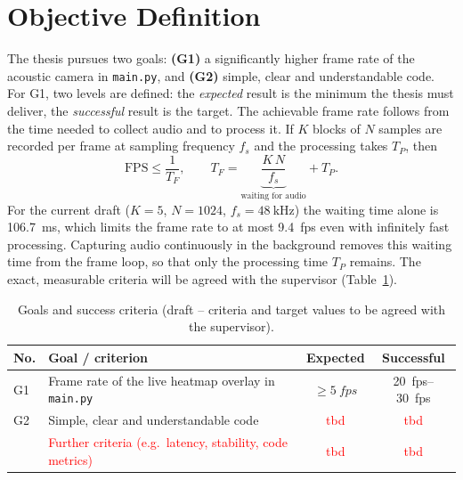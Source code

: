 \documentclass[11pt,a4paper]{article}
\newcommand{\ph}[1]{\textcolor{red}{#1}}
\newcommand{\code}[1]{\texttt{#1}}
\begin{document}
\section{Objective Definition}
The thesis pursues two goals: \textbf{(G1)} a significantly higher frame rate
of the acoustic camera in \code{main.py}, and \textbf{(G2)} simple, clear and
understandable code. For G1, two levels are defined: the \emph{expected}
result is the minimum the thesis must deliver, the \emph{successful} result is
the target. The achievable frame rate follows from the time needed to collect
audio and to process it. If $K$ blocks of $N$ samples are recorded per frame at
sampling frequency $f_s$ and the processing takes $T_P$, then
\begin{equation}
  \mathrm{FPS} \leq \frac{1}{T_F}, \qquad
  T_F = \underbrace{\frac{K\,N}{f_s}}_{\text{waiting for audio}} + T_P .
  \label{eq:fps}
\end{equation}
For the current draft ($K=5$, $N=1024$, $f_s=\SI{48}{\kilo\hertz}$) the waiting
time alone is \SI{106.7}{\milli\second}, which limits the frame rate to at most
\SI{9.4}{fps} even with infinitely fast processing. Capturing audio
continuously in the background removes this waiting time from the frame loop,
so that only the processing time $T_P$ remains. The exact, measurable criteria
will be agreed with the supervisor (Table~\ref{tab:objectives}).

\begin{table}[H]
  \centering
  \caption{Goals and success criteria (draft -- criteria and target values to be agreed with the supervisor).}
  \label{tab:objectives}
  \small
  \begin{tabularx}{\textwidth}{@{}lXcc@{}}
    \toprule
    \textbf{No.} & \textbf{Goal / criterion} & \textbf{Expected} & \textbf{Successful} \\
    \midrule
    G1 & Frame rate of the live heatmap overlay in \code{main.py} & $\geq \SI{5}{fps}$ & \SIrange{20}{30}{fps} \\
    G2 & Simple, clear and understandable code & \ph{tbd} & \ph{tbd} \\
       & \ph{Further criteria (e.g.\ latency, stability, code metrics)} & \ph{tbd} & \ph{tbd} \\
    \bottomrule
  \end{tabularx}
\end{table}
\end{document}
